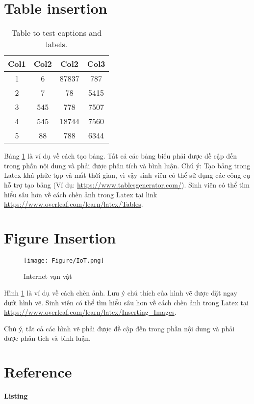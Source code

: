 \documentclass[../Main.tex]{subfiles}
\begin{document}
\section{Table insertion}
\begin{table}[h!]
\centering
\begin{tabular}{||c c c c||} 
 \hline
 Col1 & Col2 & Col2 & Col3 \\ [0.5ex] 
 \hline\hline
 1 & 6 & 87837 & 787 \\ 
 2 & 7 & 78 & 5415 \\
 3 & 545 & 778 & 7507 \\
 4 & 545 & 18744 & 7560 \\
 5 & 88 & 788 & 6344 \\ [1ex] 
 \hline
\end{tabular}
\caption{Table to test captions and labels.}
\label{table:1}
\end{table}
Bảng \ref{table:1} là ví dụ về cách tạo bảng. Tất cả các bảng biểu phải được đề cập đến trong phần nội dung và phải được phân tích và bình luận.  Chú ý: Tạo bảng trong Latex khá phức tạp và mất thời gian, vì vậy sinh viên có thể sử dụng các công cụ hỗ trợ tạo bảng (Ví dụ: \url{https://www.tablesgenerator.com/}).
Sinh viên có thể tìm hiểu sâu hơn về cách chèn ảnh trong Latex tại link \url{https://www.overleaf.com/learn/latex/Tables}.

\section{Figure Insertion}
\begin{figure}
\centering
\texttt{[image: Figure/IoT.png]}
\caption{Internet vạn vật}
\label{fig:iot}
\end{figure}

Hình \ref{fig:iot} là ví dụ về cách chèn ảnh. Lưu ý chú thích của hình vẽ được đặt ngay dưới hình vẽ. Sinh viên có thể tìm hiểu sâu hơn về cách chèn ảnh trong Latex tại \url{https://www.overleaf.com/learn/latex/Inserting_Images}.

Chú ý, tất cả các hình vẽ phải được đề cập đến trong phần nội dung và phải được phân tích và bình luận. 

\section{Reference}
\paragraph{Listing}\mbox{}
\end{document}

